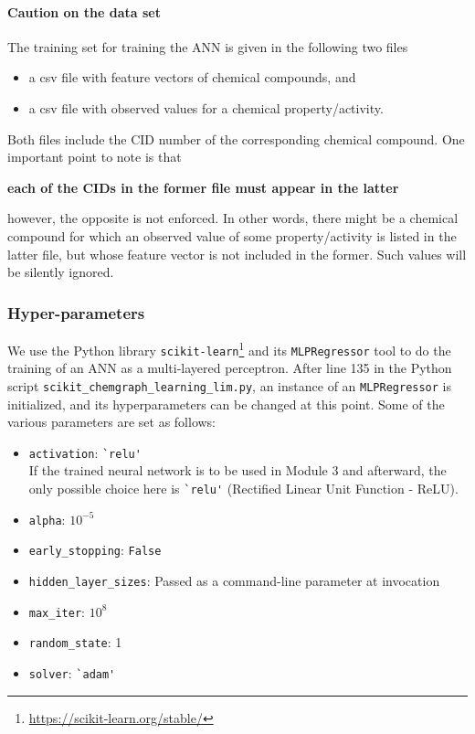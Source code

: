 \documentclass[11pt,titlepage,dvipdfmx,twoside]{book}
\begin{document}
\paragraph{Caution on the data set}
The training set for training the ANN is given 
in the following two files
%
\begin{itemize}
\item a csv file with feature vectors of chemical compounds, and 
\item a csv file with observed values for a chemical property/activity.
\end{itemize}
Both files include the CID number of the corresponding chemical compound.
One important point to note is that
%
\begin{center}
  {\bf each of the CIDs in the former file must appear in the latter }
\end{center}
%
however, the opposite is not enforced.
In other words, there might be a chemical compound
for which an observed value of some property/activity
is listed in the latter file, but whose
feature vector is not included in the former.
Such values will be silently ignored.


\subsubsection{Hyper-parameters}

We use the Python  library {\tt scikit-learn}\footnote{\url{https://scikit-learn.org/stable/}}
and its {\tt MLPRegressor} tool
to do the training of an ANN as
a multi-layered perceptron.
After line 135 in the Python script 
\verb|scikit_chemgraph_learning_lim.py|, an instance of 
an \verb|MLPRegressor| is initialized, 
and its hyperparameters can be changed at this point.
Some of the various parameters are set as follows:
\begin{itemize}
\item \verb|activation|: \verb|`relu'|  \\
{\color{red}{\bf Attention:} 
If the trained neural network is to be used in Module 3 and afterward, 
the only possible choice here is
\verb|`relu'| (Rectified Linear Unit Function - ReLU).}
\item \verb|alpha|: $10^{-5}$
\item \verb|early_stopping|: \verb|False|
\item \verb|hidden_layer_sizes|: Passed as a command-line parameter at invocation
\item \verb|max_iter|: $10^{8}$
\item \verb|random_state|: 1
\item \verb|solver|: \verb|`adam'|
\end{itemize}
\end{document}
